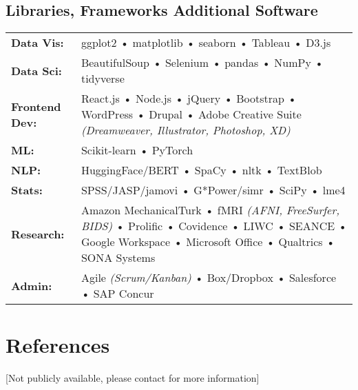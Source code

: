 \documentclass[10pt,a4paper]{cv_public}
\begin{document}
\subsection{Libraries, Frameworks \bf{\Plus} Additional Software}
\begingroup
\renewcommand{\arraystretch}{1.5}
\begin{tabular}{p{1.5in}<{\raggedleft\arraybackslash}p{4.435in}<{\raggedright\arraybackslash}}
{\bf Data Vis:} & ggplot2 • matplotlib • seaborn • Tableau • D3.js \\
{\bf Data Sci:} & BeautifulSoup • Selenium • pandas • NumPy • tidyverse \\
{\bf Frontend Dev:} & React.js • Node.js • jQuery • Bootstrap • WordPress • Drupal • Adobe Creative Suite \textsl{(Dreamweaver, Illustrator, Photoshop, XD)} \\
{\bf ML:} & Scikit-learn • PyTorch \\ %
{\bf NLP:} & HuggingFace/BERT • SpaCy • nltk • TextBlob \\
{\bf Stats:} & SPSS/JASP/jamovi • G*Power/simr • SciPy • lme4 \\
{\bf Research:} & Amazon MechanicalTurk • fMRI \textsl{(AFNI, FreeSurfer, BIDS)} • Prolific • Covidence • LIWC • SEANCE • Google Workspace • Microsoft Office • Qualtrics • SONA Systems \\
{\bf Admin:} & Agile \textsl{(Scrum/Kanban)} • Box/Dropbox • Salesforce • SAP Concur
\end{tabular}
\endgroup
\vspace{0pt}


\section{References}
[Not publicly available, please contact for more information]
\end{document}
